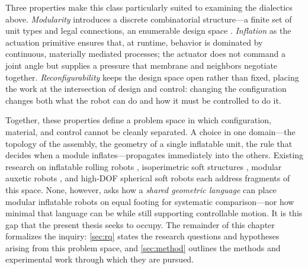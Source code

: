 Three properties make this class particularly suited to examining the dialectics above. \textit{Modularity} introduces a discrete combinatorial structure---a finite set of unit types and legal connections, an enumerable design space \citep{yim2007modular}. \textit{Inflation} as the actuation primitive ensures that, at runtime, behavior is dominated by continuous, materially mediated processes; the actuator does not command a joint angle but supplies a pressure that membrane and neighbors negotiate together. \textit{Reconfigurability} keeps the design space open rather than fixed, placing the work at the intersection of design and control: changing the configuration changes both what the robot can do and how it must be controlled to do it.

Together, these properties define a problem space in which configuration, material, and control cannot be cleanly separated. A choice in one domain---the topology of the assembly, the geometry of a single inflatable unit, the rule that decides when a module inflates---propagates immediately into the others. Existing research on inflatable rolling robots \citep{wait2010self}, isoperimetric soft structures \citep{usevitch2020untethered}, modular auxetic robots \citep{chin2022auxbots}, and high-DOF spherical soft robots \citep{nozaki2018mochibot} each address fragments of this space. None, however, asks how a \textit{shared geometric language} can place modular inflatable robots on equal footing for systematic comparison---nor how minimal that language can be while still supporting controllable motion. It is this gap that the present thesis seeks to occupy. The remainder of this chapter formalizes the inquiry: \autoref{sec:rq} states the research questions and hypotheses arising from this problem space, and \autoref{sec:method} outlines the methods and experimental work through which they are pursued.
